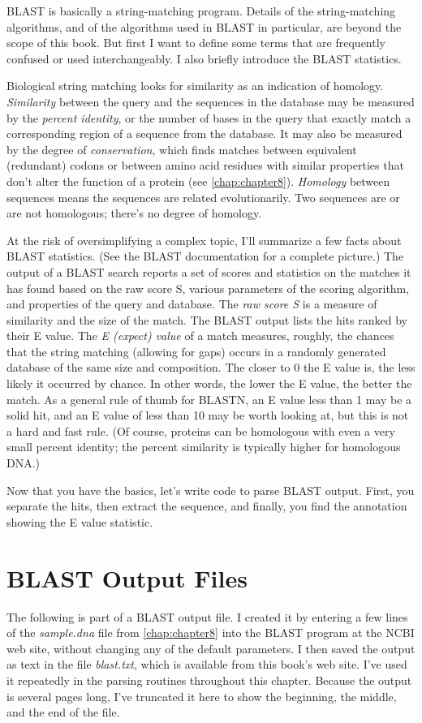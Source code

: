 BLAST is basically a string-matching program. Details of the string-matching algorithms, and of the algorithms used in BLAST in particular, are beyond the scope of this book. But first I want to define some terms that are frequently confused or used interchangeably. I also briefly introduce the BLAST statistics.

Biological string matching looks for similarity as an indication of homology. \textit{Similarity} between the query and the sequences in the database may be measured by the \textit{percent identity}, or the number of bases in the query that exactly match a corresponding region of a sequence from the database. It may also be measured by the degree of \textit{conservation}, which finds matches between equivalent (redundant) codons or between amino acid residues with similar properties that don't alter the function of a protein (see \autoref{chap:chapter8}). \textit{Homology} between sequences means the sequences are related evolutionarily. Two sequences are or are not homologous; there's no degree of homology.

At the risk of oversimplifying a complex topic, I'll summarize a few facts about BLAST statistics. (See the BLAST documentation for a complete picture.) The output of a BLAST search reports a set of scores and statistics on the matches it has found based on the raw score S, various parameters of the scoring algorithm, and properties of the query and database. The \textit{raw score S} is a measure of similarity and the size of the match. The BLAST output lists the hits ranked by their E value. The \textit{E (expect) value} of a match measures, roughly, the chances that the string matching (allowing for gaps) occurs in a randomly generated database of the same size and composition. The closer to 0 the E value is, the less likely it occurred by chance. In other words, the lower the E value, the better the match. As a general rule of thumb for BLASTN, an E value less than 1 may be a solid hit, and an E value of less than 10 may be worth looking at, but this is not a hard and fast rule. (Of course, proteins can be homologous with even a very small percent identity; the percent similarity is typically higher for homologous DNA.)

Now that you have the basics, let's write code to parse BLAST output. First, you separate the hits, then extract the sequence, and finally, you find the annotation showing the E value statistic. 

\section{BLAST Output Files}
The following is part of a BLAST output file. I created it by entering a few lines of the \textit{sample.dna} file from \autoref{chap:chapter8} into the BLAST program at the NCBI web site, without changing any of the default parameters. I then saved the output as text in the file \textit{blast.txt}, which is available from this book's web site. I've used it repeatedly in the parsing routines throughout this chapter. Because the output is several pages long, I've truncated it here to show the beginning, the middle, and the end of the file. 


